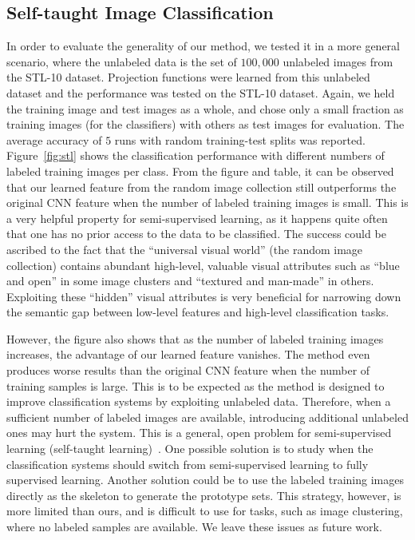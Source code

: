 \documentclass[preprint,12pt,3p]{elsarticle}
\begin{document}
\subsection{Self-taught Image Classification}
\label{sec:self}
In order to evaluate the generality of our method, we tested it in a
more general scenario, where the unlabeled data is the set of
$100,000$ unlabeled images from the STL-10 dataset. Projection
functions were learned from this unlabeled dataset and the performance
was tested on the STL-10 dataset. Again, we held the training image
and test images as a whole, and chose only a small fraction as
training images (for the classifiers) with others as test images for
evaluation.  The average accuracy of $5$ runs with random
training-test splits was reported.  Figure~\ref{fig:stl} shows the
classification performance with different numbers of labeled training
images per class.  From the figure and table, it can be observed that our
learned feature from the random image collection still outperforms the
original CNN feature when the number of labeled training images is
small.
This is a very helpful property for semi-supervised learning,
as it happens quite often that one has no prior access to the data to
be classified. The success could be ascribed to the fact that the
``universal visual world'' (the random image collection) contains
abundant high-level, valuable visual attributes such as ``blue and
open'' in some image clusters and ``textured and man-made'' in
others. Exploiting these ``hidden'' visual attributes is very
beneficial for narrowing down the semantic gap between low-level
features and high-level classification tasks.

However, the figure also shows that as the number of labeled training
images increases, the advantage of our learned feature vanishes. The
method even produces worse results than the original CNN feature when
the number of training samples is large.  This is to be expected as
the method is designed to improve classification systems by exploiting
unlabeled data. Therefore, when a sufficient
number of labeled images are available, introducing additional
unlabeled ones may hurt the system.  This is a general, open problem
for semi-supervised learning (self-taught
learning)~\citep{neverhurt:icml11}. One possible solution is to study
when the classification systems should switch from semi-supervised
learning to fully supervised learning. Another solution could be to
use the labeled training images directly as the skeleton to generate
the prototype sets. This strategy, however, is more limited than
ours, and is difficult to use for tasks, such as image
clustering, where no labeled samples are
available. We leave these issues as future work. 
\end{document}
